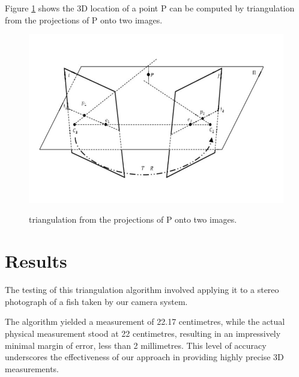 \documentclass[journal]{IEEEtran}
\begin{document}
		Figure \ref{fig:triangulation from the projections of P onto two images.} shows the 3D location of a point P can be computed by triangulation from the projections of P onto two images.
		
		\begin{figure}[h]
			\centering
			\includegraphics[width=\linewidth]{ triangulation from the projections of P onto two images.png}
			\caption{triangulation from the projections of P onto two images.}
			\label{fig:triangulation from the projections of P onto two images.}
			\cite{inproceedings}
		\end{figure}

	\section{Results}
	
	 The testing of this triangulation algorithm involved applying it to a stereo photograph of a fish taken by our camera system.
	 
	 The algorithm yielded a measurement of 22.17 centimetres, while the actual physical measurement stood at 22 centimetres, resulting in an impressively minimal margin of error, less than 2 millimetres. This level of accuracy underscores the effectiveness of our approach in providing highly precise 3D measurements.\\
	 
\end{document}

